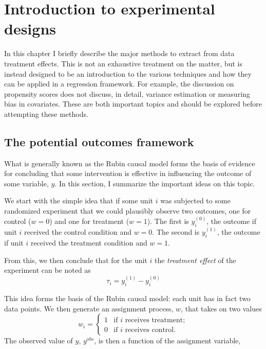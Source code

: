 



\chapter{Introduction to experimental designs}

In this chapter I briefly describe the major methods to extract from data treatment effects. This is not an exhaustive treatment on the matter, but is instead designed to be an introduction to the various techniques and how they can be applied in a regression framework. For example, the discussion on propensity scores does not discuss, in detail, variance estimation or measuring bias in covariates. These are both important topics and should be explored before attempting these methods.

\section{The potential outcomes framework}

What is generally known as the Rubin causal model forms the basis of evidence for concluding that some intervention is effective in influencing the outcome of some variable, $y$.  In this section, I summarize the important ideas on this topic.

We start with the simple idea that if some unit $i$ was subjected to some randomized experiment that we could plausibly observe two outcomes, one for control ($w=0$) and one for treatment ($w=1$). The first is $y_i^{\left(0\right)}$, the outcome if unit $i$ received the control condition and $w=0$. The second is $y_i^{\left(1\right)}$, the outcome if unit $i$ received the treatment condition and $w=1$.

From this, we then conclude that for the unit $i$ the {\it treatment effect} of the experiment can be noted as
\begin{equation}
\tau_i=y_i^{\left(1\right)}-y_i^{\left(0\right)}
\end{equation}

This idea forms the basis of the Rubin causal model: each unit has in fact two data points. We then generate an assignment process, $w$, that takes on two values
\begin{equation}
w_i = \left\{ \begin{array}{ll}
     1 & \mbox{if $i$ receives treatment};\\
     0 & \mbox{if $i$ receives control}.\end{array} \right.
\end{equation}
The observed value of $y$, $y^{obs}$, is then a function of the assignment variable,

